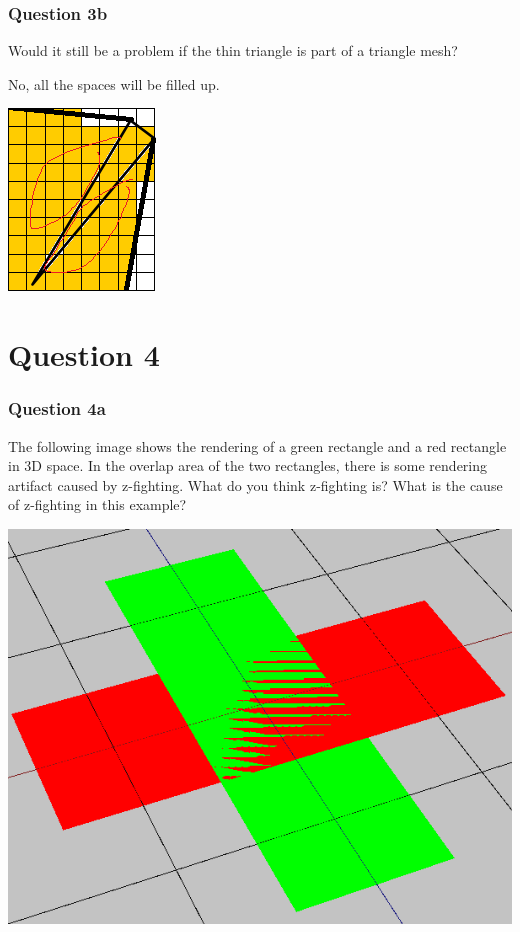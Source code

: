 \documentclass{beamer}
\begin{document}
\begin{frame}
    \frametitle{Question 3b}

    Would it still be a problem if the thin triangle is part of a triangle mesh?

    \vspace{1em}

    No, all the spaces will be filled up.

    \begin{center}
        \includegraphics[scale=0.8]{thin-tri-mesh.png}
    \end{center}

\end{frame}

\section{Question 4}

\begin{frame}
    \frametitle{Question 4a}
    The following image shows the rendering of a green rectangle and a red rectangle in 3D space. 
    In the overlap area of the two rectangles, there is some rendering artifact caused by z-fighting. 
    What do you think z-fighting is? What is the cause of z-fighting in this example? 

    \begin{center}
        \includegraphics[scale=0.25]{z-fighting.png}
    \end{center}
\end{frame}
\end{document}
